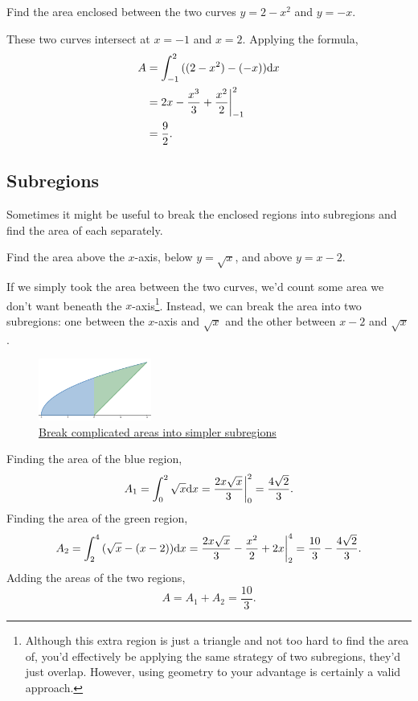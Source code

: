 \begin{example}
	Find the area enclosed between the two curves $y=2-x^2$ and $y=-x$.
\end{example}
These two curves intersect at $x=-1$ and $x=2$.
Applying the formula,
\begin{align*}
	A &= \int_{-1}^{2}{((2-x^2)-(-x))\mathrm{d} x} \\
	&= 2x-\frac{x^3}{3} + \frac{x^2}{2}\biggr\rvert_{-1}^{2} \\
	&= \frac{9}{2}.
\end{align*}

\subsection{Subregions}
Sometimes it might be useful to break the enclosed regions into subregions and find the area of each separately.
\begin{example}
	Find the area above the $x$-axis, below $y=\sqrt{x}$, and above $y=x-2$.
\end{example}
If we simply took the area between the two curves, we'd count some area we don't want beneath the $x$-axis\footnote{Although this extra region is just a triangle and not too hard to find the area of, you'd effectively be applying the same strategy of two subregions, they'd just overlap. However, using geometry to your advantage is certainly a valid approach.}.
Instead, we can break the area into two subregions: one between the $x$-axis and $\sqrt{x}$ and the other between $x-2$ and $\sqrt{x}$.
\begin{figure}[H]
	\label{subregions}
	\centering
	\includegraphics[width = 0.33\textwidth]{./applications_integrals/two_regions.png}
	\caption{\hyperref{}{}{}{Break complicated areas into simpler subregions}}
\end{figure}
\indent
Finding the area of the blue region,
\begin{equation*}
	A_1 = \int_{0}^{2}{\sqrt{x}\mathrm{d} x} = \frac{2x\sqrt{x}}{3}\biggr\rvert_0^2 = \frac{4\sqrt{2}}{3}.
\end{equation*}
\indent
Finding the area of the green region,
\begin{equation*}
	A_2 = \int_{2}^{4}{(\sqrt{x}-(x-2))\mathrm{d} x} = \frac{2x\sqrt{x}}{3} - \frac{x^2}{2} + 2x \biggr\rvert_2^4 = \frac{10}{3} - \frac{4\sqrt{2}}{3}.
\end{equation*}
\indent
Adding the areas of the two regions,
\begin{equation*}
	A = A_1 + A_2 = \frac{10}{3}.
\end{equation*}

